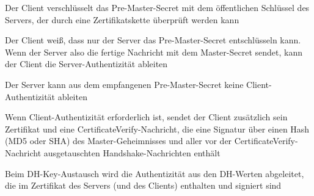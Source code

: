 \documentclass[a4paper]{article}
\begin{document}
\begin{multicols}{3}
\begin{itemize*}
\begin{itemize*}
\begin{itemize*}
                        \item Der Client verschlüsselt das Pre-Master-Secret mit dem öffentlichen Schlüssel des Servers, der durch eine Zertifikatskette überprüft werden kann
                        \item Der Client weiß, dass nur der Server das Pre-Master-Secret entschlüsseln kann. Wenn der Server also die fertige Nachricht mit dem Master-Secret sendet, kann der Client die Server-Authentizität ableiten
                        \item Der Server kann aus dem empfangenen Pre-Master-Secret keine Client-Authentizität ableiten
                        \item Wenn Client-Authentizität erforderlich ist, sendet der Client zusätzlich sein Zertifikat und eine CertificateVerify-Nachricht, die eine Signatur über einen Hash (MD5 oder SHA) des Master-Geheimnisses und aller vor der CertificateVerify-Nachricht ausgetauschten Handshake-Nachrichten enthält
                  \end{itemize*}
                  \item Beim DH-Key-Austausch wird die Authentizität aus den DH-Werten abgeleitet, die im Zertifikat des Servers (und des Clients) enthalten und signiert sind
            \end{itemize*}
      \end{itemize*}


\end{multicols}
\end{document}
